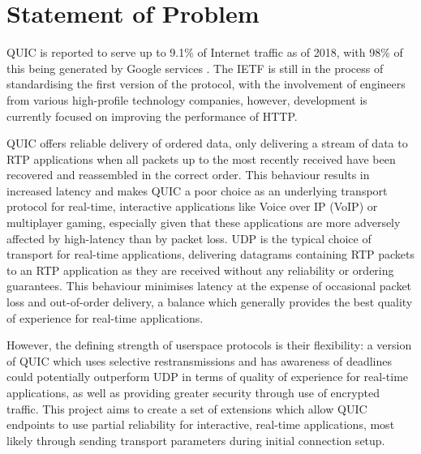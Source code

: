 \documentclass{mprop}
\begin{document}

\newpage

\section{Statement of Problem}


QUIC is reported to serve up to 9.1\% of Internet traffic as of 2018, with 98\% of this being 
generated by Google services \cite {Ruth2018}. The IETF is still in the process of standardising 
the first version of the protocol, with the involvement of engineers from various high-profile 
technology companies, however, development is currently focused on improving the performance of 
HTTP.

QUIC offers reliable delivery of ordered data, only delivering a stream of data to RTP 
applications when all packets up to the most recently received have been recovered and 
reassembled in the correct order. This behaviour results in increased latency and makes QUIC a 
poor choice as an underlying transport protocol for real-time, interactive applications like 
Voice over IP (VoIP) or multiplayer gaming, especially given that these applications are more 
adversely affected by high-latency than by packet loss. UDP is the typical choice of transport 
for real-time applications, delivering datagrams containing RTP packets to an RTP application as 
they are received without any reliability or ordering guarantees. This behaviour minimises 
latency at the expense of occasional packet loss and out-of-order delivery, a balance which 
generally provides the best quality of experience for real-time applications.

However, the defining strength of userspace protocols is their flexibility: a version of QUIC 
which uses selective restransmissions and has awareness of deadlines could potentially outperform 
UDP in terms of quality of experience for real-time applications, as well as providing greater 
security through use of encrypted traffic. This project aims to create a set of extensions which 
allow QUIC endpoints to use partial reliability for interactive, real-time applications, most 
likely through sending transport parameters during initial connection setup.

\newpage
\end{document}
